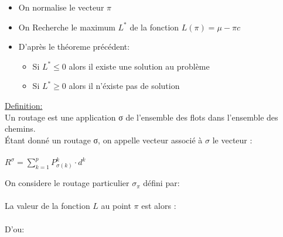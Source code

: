 \documentclass[t,10pt]{beamer}
\begin{document}
    \begin{frame}
        \begin{itemize}
            \item On normalise le vecteur $\pi$
            \item On Recherche le maximum $L^{*}$ de la fonction $L(\pi)=\mu - \pi c$
            \item D'après le théoreme précédent:
            \begin{itemize}
                \item Si $L^{*} \le 0$ alors il existe une solution au problème
                \item Si $L^{*} \ge 0$ alors il n'éxiste pas de solution
            \end{itemize}
        \end{itemize}
        \underline{Definition:} \\
        Un routage est une application σ de l’ensemble des flots dans l’ensemble des chemins. \\
        Étant donné un routage σ, on appelle vecteur associé à $\sigma$ le vecteur : \\
        \\
        \centering
        $R^{\sigma} = \displaystyle \sum_{k=1}^{p} P_{\sigma(k)}^{k} \cdot d^{k}$
    \end{frame}

    \begin{frame}
        On considere le routage particulier $\sigma_{\pi}$ défini par: \\
        \vspace{0.2cm}
        \vspace{1cm}
        \\
        La valeur de la fonction $L$ au point $\pi$ est alors :
        \\
        \vspace{0.2cm}
        \centering
        \\
        \vspace{0.5cm}
        D'ou:
        \\
        \vspace{0.5cm}
    \end{frame}
\end{document}
